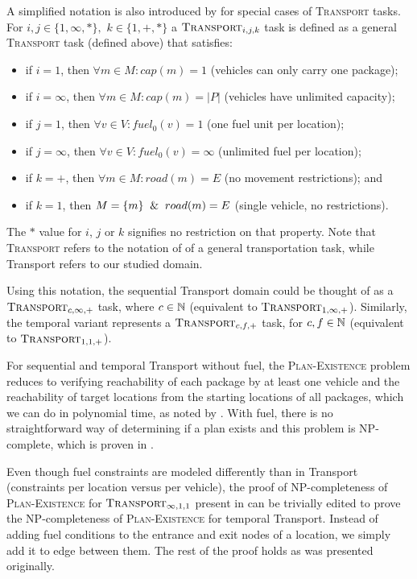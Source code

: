 A simplified notation is also introduced by \citet{Helmert2001a} for special cases of \textsc{Transport} tasks.
For $i,j \in \{1, \infty, *\},$ $k \in \{1, +, *\}$ a $\textsc{Transport}_{i,j,k}$ task is defined as a
general \textsc{Transport} task (defined above) that satisfies:
\begin{itemize}
\item if $i=1$, then $\forall m \in M : cap(m) = 1$ (vehicles can only carry one package);
\item if $i=\infty$, then $\forall m \in M : cap(m) = |P|$ (vehicles have unlimited capacity);
\item if $j=1$, then $\forall v \in V : fuel_0(v) = 1$ (one fuel unit per location);
\item if $j=\infty$, then $\forall v \in V : fuel_0(v) = \infty$ (unlimited fuel per location);
\item if $k=+$, then $\forall m \in M : road(m) = E$ (no movement restrictions); and
\item if $k=1$, then $M = \{m\} \And road(m) = E$ (single vehicle, no restrictions).
\end{itemize}
The $*$ value for $i$, $j$ or $k$ signifies no restriction on that property.
Note that
\textsc{Transport} refers to the notation of \citet{Helmert2001a} of a general transportation
task, while Transport refers to our studied domain.

Using this notation, the sequential Transport domain could be thought of as a $\textsc{Transport}_{c,\infty,+}$ task, where $c \in \mathbb{N}$
(equivalent to $\textsc{Transport}_{1,\infty,+}$).
Similarly, the temporal variant represents a $\textsc{Transport}_{c,f,+}$ task, for $c, f \in \mathbb{N}$
(equivalent to $\textsc{Transport}_{1,1,+}$).

For sequential and temporal Transport without fuel, the \textsc{Plan-Existence} problem
reduces to verifying reachability of each package by at least one vehicle
and the reachability of target locations from the starting locations of all packages,
which we can do in polynomial time, as noted by \citet[Theorem 8]{Helmert2001}.
With fuel, there is no straightforward way of determining
if a plan exists and this problem is NP-complete, which is proven in \citet[Theorem 9 and 10]{Helmert2001}.

Even though fuel constraints are modeled differently than in Transport (constraints per location versus per vehicle), the proof of 
NP-completeness of \textsc{Plan-Existence} for $\textsc{Transport}_{\infty,1,1}$
present in \citet[Theorem~3.9]{Helmert2001a}
can be trivially edited to prove the NP-completeness
of \textsc{Plan-Existence} for temporal Transport.
Instead of adding fuel conditions
to the entrance and exit nodes of a location,
we simply add it to edge between them. The rest of the proof holds as was presented originally.

